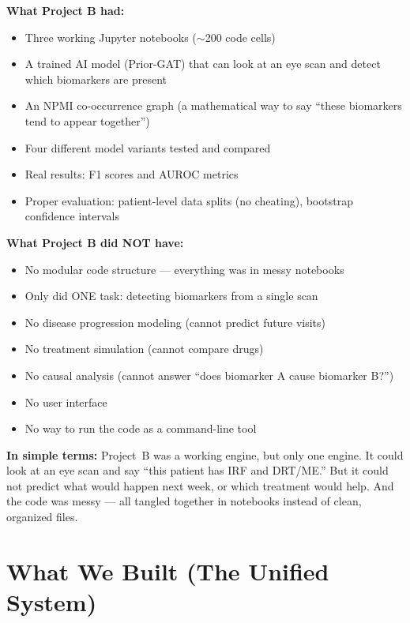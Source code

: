 \documentclass[12pt,a4paper]{article}
\begin{document}
\begin{mdframed}[style=beforebox]
\textbf{What Project B had:}
\begin{itemize}[nosep]
  \item Three working Jupyter notebooks ($\sim$200 code cells)
  \item A trained AI model (Prior-GAT) that can look at an eye scan and detect which biomarkers are present
  \item An NPMI co-occurrence graph (a mathematical way to say ``these biomarkers tend to appear together'')
  \item Four different model variants tested and compared
  \item Real results: F1 scores and AUROC metrics
  \item Proper evaluation: patient-level data splits (no cheating), bootstrap confidence intervals
\end{itemize}

\textbf{What Project B did NOT have:}
\begin{itemize}[nosep]
  \item No modular code structure --- everything was in messy notebooks
  \item Only did ONE task: detecting biomarkers from a single scan
  \item No disease progression modeling (cannot predict future visits)
  \item No treatment simulation (cannot compare drugs)
  \item No causal analysis (cannot answer ``does biomarker A cause biomarker B?'')
  \item No user interface
  \item No way to run the code as a command-line tool
\end{itemize}
\end{mdframed}

\textbf{In simple terms:} Project~B was a working engine, but only one engine. It could look at an eye scan and say ``this patient has IRF and DRT/ME.'' But it could not predict what would happen next week, or which treatment would help. And the code was messy --- all tangled together in notebooks instead of clean, organized files.


\section{What We Built (The Unified System)}
\end{document}
